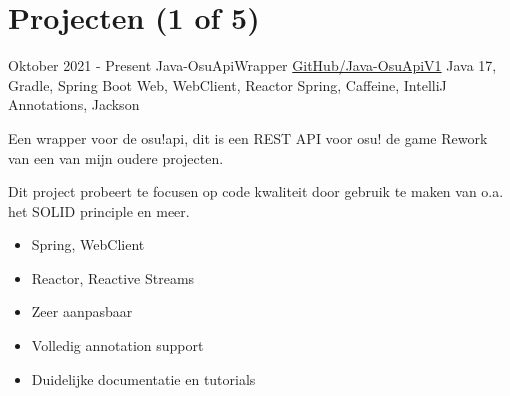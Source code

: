 \documentclass[letterpaper]{twentysecondcv} %
\begin{document}
\section{Projecten (1 of 5)}
\begin{twenty} %
	\twentyitem
    		{Oktober 2021 -}
		{Present}
        		{Java-OsuApiWrapper}
        		{\href{https://github.com/Tais993/Java-OsuApiV1/}{GitHub/Java-OsuApiV1}}
        		{Java 17, Gradle, Spring Boot Web, WebClient, Reactor Spring, Caffeine, IntelliJ Annotations, Jackson}
				{
				Een wrapper voor de osu!api, dit is een REST API voor osu! de game
				Rework van een van mijn oudere projecten.

				Dit project probeert te focusen op code kwaliteit door gebruik te maken van o.a. het SOLID principle en meer.
				\begin{itemize}
					\item Spring, WebClient
					\item Reactor, Reactive Streams
					\item Zeer aanpasbaar
					\item Volledig annotation support
					\item Duidelijke documentatie en tutorials
				\end{itemize}}\\

\end{twenty}

\newpage

\makesidebarSecond %

\end{document}
